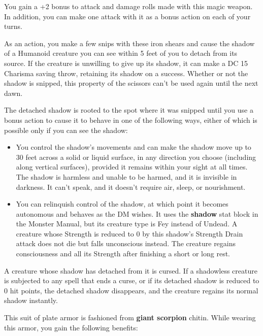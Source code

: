\documentclass[10pt,a4paper,twoside,bg=print,twocolumn,openany,nodeprecatedcode]{dndbook}
\begin{document}
You gain a +2 bonus to attack and damage rolls made with this magic weapon. In addition, you can make one attack with it as a bonus action on each of your turns.

As an action, you make a few snips with these iron shears and cause the shadow of a Humanoid creature you can see within 5 feet of you to detach from its source. If the creature is unwilling to give up its shadow, it can make a DC 15 Charisma saving throw, retaining its shadow on a success. Whether or not the shadow is snipped, this property of the scissors can't be used again until the next dawn.

The detached shadow is rooted to the spot where it was snipped until you use a bonus action to cause it to behave in one of the following ways, either of which is possible only if you can see the shadow:


\begin{itemize}
\item You control the shadow's movements and can make the shadow move up to 30 feet across a solid or liquid surface, in any direction you choose (including along vertical surfaces), provided it remains within your sight at all times. The shadow is harmless and unable to be harmed, and it is invisible in darkness. It can't speak, and it doesn't require air, sleep, or nourishment.
\item You can relinquish control of the shadow, at which point it becomes autonomous and behaves as the DM wishes. It uses the \textbf{shadow} stat block in the Monster Manual, but its creature type is Fey instead of Undead. A creature whose Strength is reduced to 0 by this shadow's Strength Drain attack does not die but falls unconscious instead. The creature regains consciousness and all its Strength after finishing a short or long rest.
\end{itemize}

A creature whose shadow has detached from it is cursed. If a shadowless creature is subjected to any spell that ends a curse, or if its detached shadow is reduced to 0 hit points, the detached shadow disappears, and the creature regains its normal shadow instantly.

This suit of plate armor is fashioned from \textbf{giant scorpion} chitin. While wearing this armor, you gain the following benefits:
\end{document}
